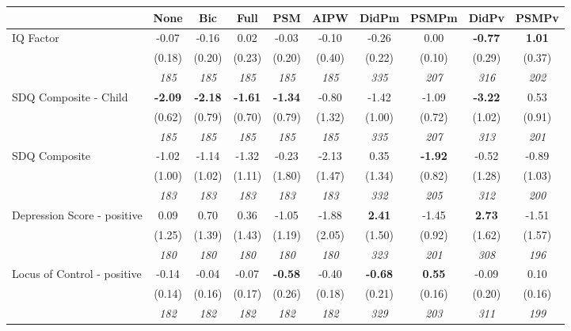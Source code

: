 \begin{tabular}{l c c c c c c c c c}
\toprule
 & None & Bic & Full & PSM & AIPW & DidPm & PSMPm & DidPv & PSMPv \\
\midrule
IQ Factor & -0.07 & -0.16 & 0.02 & -0.03 & -0.10 & -0.26 & 0.00 & \textbf{ -0.77 } & \textbf{1.01} \\
& (0.18) & (0.20) & (0.23) & (0.20) & (0.40) & (0.22) & (0.10) & (0.29) & (0.37) \\
& \textit{ 185 } & \textit{ 185 } & \textit{ 185 } & \textit{ 185 } & \textit{ 185 } & \textit{ 335 } & \textit{ 207 } & \textit{ 316 } & \textit{ 202 } \\
SDQ Composite - Child & \textbf{ -2.09 } & \textbf{ -2.18 } & \textbf{ -1.61 } & \textbf{-1.34} & -0.80 & -1.42 & -1.09 & \textbf{ -3.22 } & 0.53 \\
& (0.62) & (0.79) & (0.70) & (0.79) & (1.32) & (1.00) & (0.72) & (1.02) & (0.91) \\
& \textit{ 185 } & \textit{ 185 } & \textit{ 185 } & \textit{ 185 } & \textit{ 185 } & \textit{ 335 } & \textit{ 207 } & \textit{ 313 } & \textit{ 201 } \\
SDQ Composite & -1.02 & -1.14 & -1.32 & -0.23 & -2.13 & 0.35 & \textbf{-1.92} & -0.52 & -0.89 \\
& (1.00) & (1.02) & (1.11) & (1.80) & (1.47) & (1.34) & (0.82) & (1.28) & (1.03) \\
& \textit{ 183 } & \textit{ 183 } & \textit{ 183 } & \textit{ 183 } & \textit{ 183 } & \textit{ 332 } & \textit{ 205 } & \textit{ 312 } & \textit{ 200 } \\
Depression Score - positive & 0.09 & 0.70 & 0.36 & -1.05 & -1.88 & \textbf{ 2.41 } & -1.45 & \textbf{ 2.73 } & -1.51 \\
& (1.25) & (1.39) & (1.43) & (1.19) & (2.05) & (1.50) & (0.92) & (1.62) & (1.57) \\
& \textit{ 180 } & \textit{ 180 } & \textit{ 180 } & \textit{ 180 } & \textit{ 180 } & \textit{ 323 } & \textit{ 201 } & \textit{ 308 } & \textit{ 196 } \\
Locus of Control - positive & -0.14 & -0.04 & -0.07 & \textbf{-0.58} & -0.40 & \textbf{ -0.68 } & \textbf{0.55} & -0.09 & 0.10 \\
& (0.14) & (0.16) & (0.17) & (0.26) & (0.18) & (0.21) & (0.16) & (0.20) & (0.16) \\
& \textit{ 182 } & \textit{ 182 } & \textit{ 182 } & \textit{ 182 } & \textit{ 182 } & \textit{ 329 } & \textit{ 203 } & \textit{ 311 } & \textit{ 199 } \\

\end{tabular}
